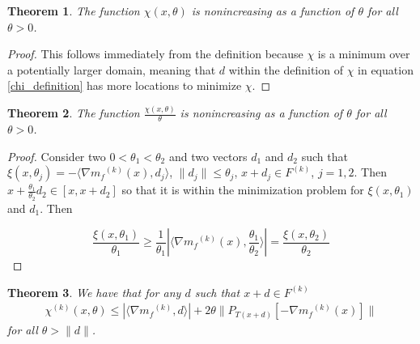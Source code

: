 \documentclass{article}
\newtheorem{theorem}{Theorem}[section]
\theoremstyle{case}
\newcommand{\modelk}{{{m}_f}^{(k)}}
\newcommand{\feasiblek}{{F}^{(k)}}
\newcommand{\chik}{{\chi^{(k)}}}
\begin{document}
\begin{theorem}
\label{chi_non_inc}
\label{12_1_5_1}
The function $\chi(x,\theta)$ is nonincreasing as a function of $\theta$ for all $\theta>0$.
\end{theorem}

\begin{proof}
This follows immediately from the definition because $\chi$ is a minimum over a potentially larger domain, meaning that $d$ within the definition of $\chi$ in equation \ref{chi_definition} has more locations to minimize $\chi$.
\end{proof}

\begin{theorem}
\label{chi_non_inc}
The function $\frac{\chi(x,\theta)}{\theta}$ is nonincreasing as a function of $\theta$ for all $\theta>0$.
\end{theorem}

\begin{proof}
Consider two $0 < \theta_1 < \theta_2$  and two vectors $d_1$ and $d_2$ such that
$\xi(x, \theta_j) = -\langle\nabla \modelk(x), d_j\rangle$, $\|d_j\|\le\theta_j$, $x + d_j \in \feasiblek$, $j=1,2$.
Then $x + \frac {\theta_1}{\theta_2} d_2 \in [x, x + d_2]$ so that it is within the minimization problem for $\xi(x, \theta_1)$ and $d_1$.
Then

\[
\frac{\xi(x, \theta_1)}{\theta_1} \ge \frac 1 {\theta_1} |\langle\nabla\modelk(x), \frac{\theta_1}{\theta_2}\rangle| = \frac{\xi(x, \theta_2)}{\theta_2}
\]

\end{proof}

\begin{theorem}
We have that for any $d$ such that $x + d \in \feasiblek$
\begin{align}
\label{12_1_5_3}
\chik(x, \theta) \le |\langle\nabla \modelk, d\rangle| + 2\theta \|P_{T(x+d)}[-\nabla\modelk(x)]\|
\end{align}
for all $\theta > \|d\|$.
\end{theorem}
\end{document}
